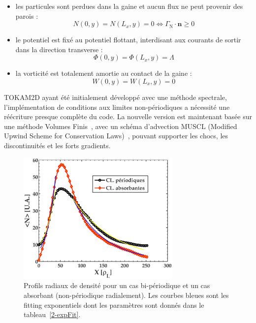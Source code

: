 \begin{refsection}
	\begin{itemize}
	  \item les particules sont perdues dans la gaine et aucun flux ne peut
	  provenir des parois :
	  \begin{equation}
	  	N(0,y)=N(L_x,y)=0 \Leftrightarrow \Gamma_\text{N}\cdot\mathbf
	  	n\ge0
	  \end{equation}
	  \item le
	potentiel est fixé au potentiel flottant, interdisant aux
	courants de sortir dans la direction transverse :
	\begin{equation}
	  	\Phi(0,y)=\Phi(L_x,y)=\Lambda
	  \end{equation}
	\item la vorticité est totalement amortie au contact de la gaine  :
	\begin{equation}
	  	W(0,y)=W(L_x,y)=0
	  \end{equation}
	\end{itemize}
	
	TOKAM2D ayant été initialement
	développé avec une méthode spectrale, l'implémentation de conditions aux
	limites non-périodiques a nécessité une réécriture presque complète du code.
	La nouvelle version est maintenant basée sur une méthode Volumes
	Finis~\parencite{toro}, avec un schéma d'advection MUSCL (Modified Upwind
	Scheme for Conservation Laws)~\parencite{vanLeer}, pouvant supporter les chocs,
	les discontinuités et les forts gradients.
	
\begin{figure}[!htbp]
\centering
    \includegraphics[width=8cm]{figures/2-profileDenNoLimit.eps}
    \caption{Profils radiaux
    de densité pour un cas bi-périodique et un cas absorbant
    (non-périodique radialement)\label{2-profileDenNoLimit}. Les courbes bleues
    sont les fitting exponentiels dont les paramètres sont
    donnés dans le tableau~\ref{2-expFit}.}
\end{figure}


\end{refsection}
